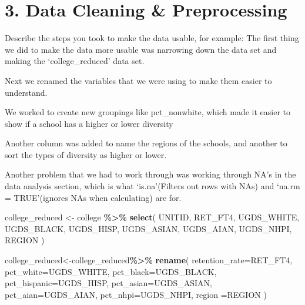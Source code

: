 \documentclass[
]{article}
\newenvironment{Shaded}{\begin{snugshade}}{\end{snugshade}}
\newcommand{\AttributeTok}[1]{\textcolor[rgb]{0.13,0.29,0.53}{#1}}
\newcommand{\FunctionTok}[1]{\textcolor[rgb]{0.13,0.29,0.53}{\textbf{#1}}}
\newcommand{\NormalTok}[1]{#1}
\newcommand{\OtherTok}[1]{\textcolor[rgb]{0.56,0.35,0.01}{#1}}
\newcommand{\SpecialCharTok}[1]{\textcolor[rgb]{0.81,0.36,0.00}{\textbf{#1}}}
\begin{document}
\section{3. Data Cleaning \&
Preprocessing}\label{data-cleaning-preprocessing}

Describe the steps you took to make the data usable, for example: The
first thing we did to make the data more usable was narrowing down the
data set and making the `college\_reduced' data set.

Next we renamed the variables that we were using to make them easier to
understand.

We worked to create new groupings like pct\_nonwhite, which made it
easier to show if a school has a higher or lower diversity

Another column was added to name the regions of the schools, and another
to sort the types of diversity as higher or lower.

Another problem that we had to work through was working through NA's in
the data analysis section, which is what `is.na'(Filters out rows with
NAs) and `na.rm = TRUE'(ignores NAs when calculating) are for.

\begin{Shaded}
\begin{Highlighting}[]
\NormalTok{college\_reduced }\OtherTok{\textless{}{-}}\NormalTok{ college }\SpecialCharTok{\%\textgreater{}\%}
\FunctionTok{select}\NormalTok{(}
\NormalTok{UNITID,}
\NormalTok{RET\_FT4,}
\NormalTok{UGDS\_WHITE,}
\NormalTok{UGDS\_BLACK,}
\NormalTok{UGDS\_HISP,}
\NormalTok{UGDS\_ASIAN,}
\NormalTok{UGDS\_AIAN,}
\NormalTok{UGDS\_NHPI,}
\NormalTok{REGION}
\NormalTok{)}
\end{Highlighting}
\end{Shaded}

\begin{Shaded}
\begin{Highlighting}[]
\NormalTok{college\_reduced}\OtherTok{\textless{}{-}}\NormalTok{college\_reduced}\SpecialCharTok{\%\textgreater{}\%}
\FunctionTok{rename}\NormalTok{(}
\AttributeTok{retention\_rate=}\NormalTok{RET\_FT4,}
\AttributeTok{pct\_white=}\NormalTok{UGDS\_WHITE,}
\AttributeTok{pct\_black=}\NormalTok{UGDS\_BLACK,}
\AttributeTok{pct\_hispanic=}\NormalTok{UGDS\_HISP,}
\AttributeTok{pct\_asian=}\NormalTok{UGDS\_ASIAN,}
\AttributeTok{pct\_aian=}\NormalTok{UGDS\_AIAN,}
\AttributeTok{pct\_nhpi=}\NormalTok{UGDS\_NHPI,}
\AttributeTok{region =}\NormalTok{REGION}
\NormalTok{)}
\end{Highlighting}
\end{Shaded}
\end{document}
